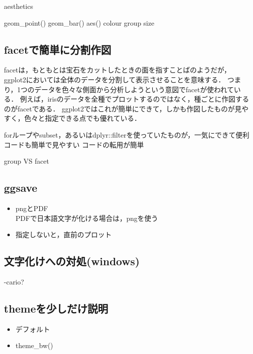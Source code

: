 \documentclass[
]{article}
\providecommand{\tightlist}{%
  \setlength{\itemsep}{0pt}\setlength{\parskip}{0pt}}
\begin{document}
aesthetics

geom\_point()
geom\_bar()
aes()
colour
group
size

\hypertarget{facetux3067ux7c21ux5358ux306bux5206ux5272ux4f5cux56f3}{%
\subsection{facetで簡単に分割作図}\label{facetux3067ux7c21ux5358ux306bux5206ux5272ux4f5cux56f3}}

facetは，もともとは宝石をカットしたときの面を指すことばのようだが，ggplot2においては全体のデータを分割して表示させることを意味する．
つまり，1つのデータを色々な側面から分析しようという意図でfacetが使われている．
例えば，irisのデータを全種でプロットするのではなく，種ごとに作図するのがfacetである．
ggplot2ではこれが簡単にできて，しかも作図したものが見やすく，色々と指定できる点でも優れている．

forループやsubset，あるいはdplyr::filterを使っていたものが，一気にできて便利
コードも簡単で見やすい
コードの転用が簡単

group VS facet

\hypertarget{ggsave}{%
\subsection{ggsave}\label{ggsave}}

\begin{itemize}
\item
  pngとPDF\\
  PDFで日本語文字が化ける場合は，pngを使う
\item
  指定しないと，直前のプロット
\end{itemize}

\hypertarget{ux6587ux5b57ux5316ux3051ux3078ux306eux5bfeux51e6windows}{%
\subsection{文字化けへの対処(windows)}\label{ux6587ux5b57ux5316ux3051ux3078ux306eux5bfeux51e6windows}}

-cario?

\hypertarget{themeux3092ux5c11ux3057ux3060ux3051ux8aacux660e}{%
\subsection{themeを少しだけ説明}\label{themeux3092ux5c11ux3057ux3060ux3051ux8aacux660e}}

\begin{itemize}
\tightlist
\item
  デフォルト\\
\item
  theme\_bw()
\end{itemize}
\end{document}
